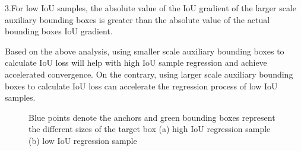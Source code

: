 \documentclass[lettersize,journal]{IEEEtran}
\begin{document}
	\par 3.For low IoU samples, the absolute value of the IoU gradient of the larger scale auxiliary bounding boxes is greater than the absolute value of the actual bounding boxes IoU gradient.
	\par Based on the above analysis, using smaller scale auxiliary bounding boxes to calculate IoU loss will help with high IoU sample regression and achieve accelerated convergence. On the contrary, using larger scale auxiliary bounding boxes to calculate IoU loss can accelerate the regression process of low IoU samples.
	\begin{figure}[!htbp]
		\hfill
		\caption{Blue points denote the anchors and green bounding boxes represent the different sizes of the target box (a) high IoU regression sample (b) low IoU regression sample}
		\label{fig_6}
	\end{figure}
\end{document}
